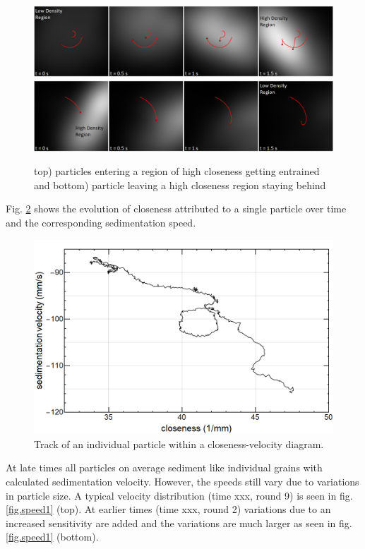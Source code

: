 \begin{figure}[h]
\includegraphics[width=\columnwidth]{track1.png}
\includegraphics[width=\columnwidth]{track2.png}
    \caption{\label{fig.entrain1} top) particles entering a region of high closeness getting entrained and bottom) particle leaving a high closeness region staying behind}
\end{figure}

Fig. \ref{fig.track} shows the evolution of closeness attributed to a single particle over time
and the corresponding sedimentation speed.

\begin{figure}[h]
\includegraphics[width=\columnwidth]{track.png}
    \caption{\label{fig.track} Track of an individual particle within a closeness-velocity diagram.}
\end{figure}

At late times all particles on average sediment like individual grains with calculated sedimentation velocity. However, the speeds still vary due to variations in particle size. A typical velocity distribution (time xxx, round 9) is seen in fig. \ref{fig.speed1} (top).
At earlier times (time xxx, round 2) variations due to an increased sensitivity are added and the variations are much larger as seen in fig. \ref{fig.speed1} (bottom). 


